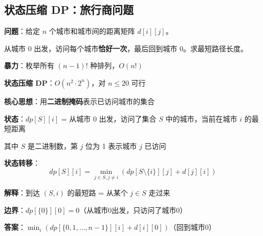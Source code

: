 \documentclass[12pt, a4paper]{ctexart}
\begin{document}
\subsection{状态压缩 DP：旅行商问题}

\begin{blackboard}

\textbf{问题}：给定 $n$ 个城市和城市间的距离矩阵 $d[i][j]$。

从城市 0 出发，访问每个城市\textbf{恰好一次}，最后回到城市 0。求最短路径长度。

\textbf{暴力}：枚举所有 $(n-1)!$ 种排列，$O(n!)$

\textbf{状态压缩 DP}：$O(n^2 \cdot 2^n)$，对 $n \leq 20$ 可行

\textbf{核心思想}：用\textbf{二进制掩码}表示已访问城市的集合

\end{blackboard}

\begin{blackboard}

\textbf{状态}：$dp[S][i]$ = 从城市 0 出发，访问了集合 $S$ 中的城市，当前在城市 $i$ 的最短距离

其中 $S$ 是二进制数，第 $j$ 位为 1 表示城市 $j$ 已访问

\textbf{状态转移}：
\[
dp[S][i] = \min_{j \in S, j \neq i} \left( dp[S \setminus \{i\}][j] + d[j][i] \right)
\]

\textbf{解释}：到达 $(S, i)$ 的最短路 = 从某个 $j \in S$ 走过来

\textbf{边界}：$dp[\{0\}][0] = 0$（从城市0出发，只访问了城市0）

\textbf{答案}：$\min_i \left( dp[\{0,1,\ldots,n-1\}][i] + d[i][0] \right)$（回到城市0）

\end{blackboard}
\end{document}
